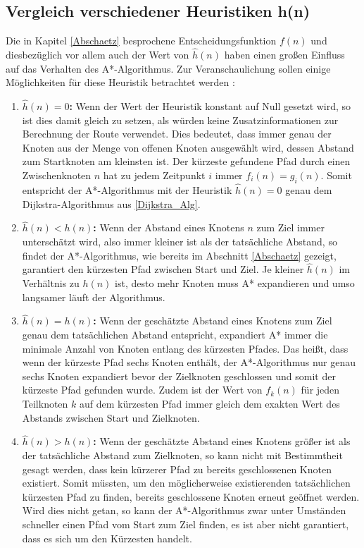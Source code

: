 	\subsection{Vergleich verschiedener Heuristiken h(n)}
		\label{Heuristik}
		Die in Kapitel \ref{Abschaetz} besprochene Entscheidungsfunktion $f(n)$ und diesbezüglich vor allem auch der Wert von $\hat{h}(n)$ haben einen großen Einfluss auf das Verhalten des A*-Algorithmus.
		Zur Veranschaulichung sollen einige Möglichkeiten für diese Heuristik betrachtet werden \cite{Patel2016}:
		\begin{enumerate}
			\item \textbf{$\hat{h}(n)=0$:} Wenn der Wert der Heuristik konstant auf Null gesetzt wird, so ist dies damit gleich zu setzen, als würden keine Zusatzinformationen zur Berechnung der Route verwendet. Dies bedeutet, dass immer genau der Knoten aus der Menge von offenen Knoten ausgewählt wird, dessen Abstand zum Startknoten am kleinsten ist. Der kürzeste gefundene Pfad durch einen Zwischenknoten $n$ hat zu jedem Zeitpunkt $i$ immer $f_i(n)=g_i(n)$. Somit entspricht der A*-Algorithmus mit der Heuristik $\hat{h}(n)=0$ genau dem Dijkstra-Algorithmus aus \ref{Dijkstra_Alg}.
			
			\item \textbf{$\hat{h}(n)<h(n)$:} Wenn der Abstand eines Knotens $n$ zum Ziel immer unterschätzt wird, also immer kleiner ist als der tatsächliche Abstand, so findet der A*-Algorithmus, wie bereits im Abschnitt \ref{Abschaetz} gezeigt, garantiert den kürzesten Pfad zwischen Start und Ziel. Je kleiner $\hat{h}(n)$ im Verhältnis zu $h(n)$ ist, desto mehr Knoten muss A* expandieren und umso langsamer läuft der Algorithmus.
			
			\item \textbf{$\hat{h}(n)=h(n)$:} Wenn der geschätzte Abstand eines Knotens zum Ziel genau dem tatsächlichen Abstand entspricht, expandiert A* immer die minimale Anzahl von Knoten entlang des kürzesten Pfades. Das heißt, dass wenn der kürzeste Pfad sechs Knoten enthält, der A*-Algorithmus nur genau sechs Knoten expandiert bevor der Zielknoten geschlossen und somit der kürzeste Pfad gefunden wurde. Zudem ist der Wert von $f_k(n)$ für jeden Teilknoten $k$ auf dem kürzesten Pfad immer gleich dem exakten Wert des Abstands zwischen Start und Zielknoten.
			
			\item \textbf{$\hat{h}(n)>h(n)$:} Wenn der geschätzte Abstand eines Knotens größer ist als der tatsächliche Abstand zum Zielknoten, so kann nicht mit Bestimmtheit gesagt werden, dass kein kürzerer Pfad zu bereits geschlossenen Knoten existiert.  Somit müssten, um den möglicherweise existierenden tatsächlichen kürzesten Pfad zu finden, bereits geschlossene Knoten erneut geöffnet werden. Wird dies nicht getan, so kann der A*-Algorithmus zwar unter Umständen schneller einen Pfad vom Start zum Ziel finden, es ist aber nicht garantiert, dass es sich um den Kürzesten handelt.
			

\end{enumerate}
